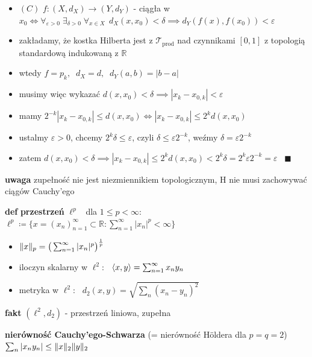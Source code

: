 \documentclass[a4paper,12pt]{article}
\begin{document}
\begin{steps}
\begin{itemize}
\begin{itemize}
            \item \((C)\) \; \(f: (X, d_X) \to (Y, d_Y)\) - ciągła w \(x_0 \iff \forall_{\varepsilon > 0} \; \exists_{\delta > 0} \; \forall_{x \in X} \;\, d_X(x, x_0) < \delta \implies d_Y(f(x), f(x_0)) < \varepsilon\)
            \item zakładamy, że kostka Hilberta jest z \(\mathcal{T}_{\text{prod}}\) nad czynnikami \([0, 1]\) z topologią standardową indukowaną z \(\mathbb{R}\)
            \item wtedy \(f = p_k, \;\; d_X = d, \;\; d_Y(a, b) = |b - a|\)
            \item musimy więc wykazać \(d(x, x_0) < \delta \implies |x_k - x_{0, k}| < \varepsilon\)
            \item mamy \(2^{-k} |x_k - x_{0, k}| \leq d(x, x_0) \iff |x_k - x_{0, k}| \leq 2^k d(x, x_0)\)
            \item ustalmy \(\varepsilon > 0\), chcemy \(2^k \delta \leq \varepsilon\), czyli \(\delta \leq \varepsilon 2^{-k}\), \; weźmy \(\delta = \varepsilon 2^{-k}\)
            \item zatem \(d(x, x_0) < \delta \implies |x_k - x_{0, k}| \leq 2^k d(x, x_0) < 2^k \delta = 2^k \varepsilon 2^{-k} = \varepsilon\) \, \(\blacksquare\)
        \end{itemize}
    \end{itemize}
\end{steps}

\bigskip
\textbf{uwaga} \; zupełność nie jest niezmiennikiem topologicznym, H nie musi zachowywać ciągów Cauchy'ego

\bigskip
\textbf{def} \; \textbf{przestrzeń} \(\ell^p\) \, dla \(1 \leq p < \infty\): \, \(\ell^p \coloneqq \{x = (x_n)_{n=1}^{\infty} \subset \mathbb{R} : \sum_{n=1}^{\infty} |x_n|^p < \infty\}\)
\begin{itemize}
    \item \(\lVert x\rVert_p = \big(\sum_{n=1}^{\infty} |x_n|^p\big)^{\frac{1}{p}}\)
    \item iloczyn skalarny w \(\ell^2\): \, \(\langle x, y\rangle = \sum_{n=1}^{\infty} x_n y_n\)
    \item metryka w \(\ell^2\): \, \(d_2(x, y) = \sqrt{\sum_n (x_n - y_n)^2}\)
\end{itemize}

\smallskip
\textbf{fakt} \; \((\ell^2, d_2)\) - przestrzeń liniowa, zupełna

\smallskip
\textbf{nierówność Cauchy'ego-Schwarza} \; (= nierówność Höldera dla \(p = q = 2\)) \, \(\sum_n |x_n y_n| \leq \lVert x\rVert_2 \lVert y\rVert_2\)
\end{document}
